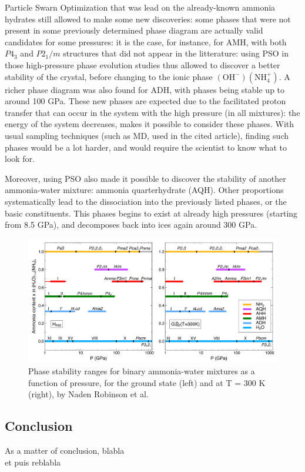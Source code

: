 \documentclass[11pt]{article}
\begin{document}
\begin{multicols}{2}
Particle Swarn Optimization that was lead on the already-known ammonia hydrates still allowed to make some new discoveries: some phases that were not present in some previously determined phase diagram are actually valid candidates for some pressures: it is the case, for instance, for AMH, with both $P4_3$ and $P2_1/m$ structures that did not appear in the litterature: using PSO in those high-pressure phase evolution studies thus allowed to discover a better stability of the crystal, before changing to the ionic phase $(\mathrm{OH}^-)(\mathrm{NH}_4^+)$. A richer phase diagram was also found for ADH, with phases being stable up to around 100 GPa. These new phases are expected due to the facilitated proton transfer that can occur in the system with the high pressure (in all mixtures): the energy of the system decreases, makes it possible to consider these phases. With usual sampling techniques (such as MD, used in the cited article), finding such phases would be a lot harder, and would require the scientist to know what to look for.\vspace{1em}

Moreover, using PSO also made it possible to discover the stability of another ammonia-water mixture: ammonia quarterhydrate (AQH). Other proportions systematically lead to the dissociation into the previously listed phases, or the basic constituents. This phases begins to exist at already high pressures (starting from 8.5 GPa), and decomposes back into ices again around 300 GPa.

\end{multicols}
\begin{figure}[h]
    \centering
    \includegraphics[width=\textwidth]{figures/phase-diagram.png}
    \caption{Phase stability ranges for binary ammonia-water mixtures as a function of pressure, for the ground state (left) and at T = 300 K (right), by Naden Robinson et al. \cite{original}}
\end{figure}
\begin{multicols}{2}

\section*{Conclusion}
As a matter of conclusion, blabla\\et puis reblabla
\end{multicols}


\end{document}
